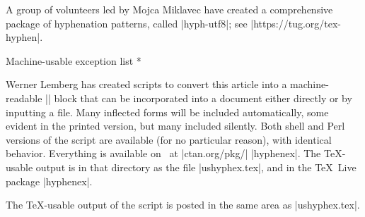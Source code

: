 A group of volunteers led by Mojca Miklavec
have created a comprehensive package of hyphenation patterns, called
|hyph-utf8|; see\newline
|https://tug.org/tex-hyphen|.

\head * Machine-usable exception list *

Werner Lemberg has created scripts to convert this article into a
machine-readable |\hyphenation| block that can be incorporated into a
document either directly or by inputting a file.  Many inflected forms
will be included automatically, some evident in the printed version, but
many included silently.  Both shell and Perl versions of the script are
available (for no particular reason), with identical behavior.
Everything is available on \CTAN\ at
\hbox{|ctan.org/pkg/|} |hyphenex|.
The \TeX-usable output is in that directory as the file
|ushyphex.tex|, and in the \TeX\ Live package |hyphenex|.

The \TeX-usable output of the script is posted in the same area as
|ushyphex.tex|.



\def\printhyphens#1{%
 \setbox0\vbox{%
  \pretolerance-1\hyphenpenalty-10000%
  \hsize0pt\leftskip0pt\rightskip0pt\parfillskip0pt%
  \hbadness100\hfuzz\maxdimen
  \offinterlineskip
  \interlinepenalty0\clubpenalty0\widowpenalty0\brokenpenalty0%
  \noindent\hskip0pt #1\par
  \setbox0\lastbox \global\setbox1\hbox{\hbox{\unhbox0}}%
  \loop \unskip \setbox0\lastbox \ifhbox0%
   \global\setbox1\hbox{\hbox{\unhbox0}\discretionary{}{}{}\unhbox1}%
  \repeat}%
}

%
%
%
%
%


